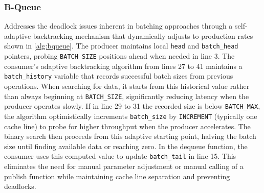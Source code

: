 \subsubsection{B-Queue}
Addresses the deadlock issues inherent in batching approaches through a self-adaptive backtracking mechanism that dynamically adjusts to production rates shown in \cref{alg:bqueue}. The producer maintains local \texttt{head} and \texttt{batch\_head} pointers, probing \texttt{BATCH\_SIZE} positions ahead when needed in line 3. The consumer's adaptive backtracking algorithm from lines 27 to 41 maintains a \texttt{batch\_history} variable that records successful batch sizes from previous operations. When searching for data, it starts from this historical value rather than always beginning at \texttt{BATCH\_SIZE}, significantly reducing latency when the producer operates slowly. If in line 29 to 31 the recorded size is below \texttt{BATCH\_MAX}, the algorithm optimistically increments \texttt{batch\_size} by \texttt{INCREMENT} (typically one cache line) to probe for higher throughput when the producer accelerates. The binary search then proceeds from this adaptive starting point, halving the batch size until finding available data or reaching zero. In the dequeue function, the consumer uses this computed value to update \texttt{batch\_tail} in line 15. This eliminates the need for manual parameter adjustment or manual calling of a publish function while maintaining cache line separation and preventing deadlocks. \cite{Wang2013BQueue}

